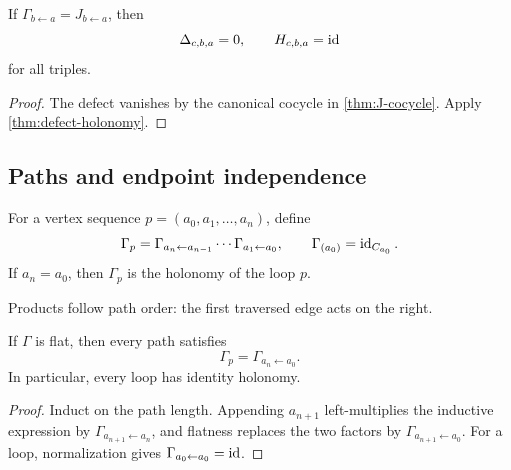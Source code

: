 \begin{corollary}
\label{cor:canonical-zero-defect}
If $\Gamma_{b\leftarrow a}=J_{b\leftarrow a}$, then
\[
\Delta_{c,b,a}=0,
\qquad
H_{c,b,a}=\operatorname{id}
\]
for all triples.
\end{corollary}

\begin{proof}
The defect vanishes by the canonical cocycle in
\cref{thm:J-cocycle}. Apply \cref{thm:defect-holonomy}.
\end{proof}

\subsection{Paths and endpoint independence}

\begin{definition}
\label{def:path-transport}
For a vertex sequence
$p=(a_0,a_1,\ldots,a_n)$, define
\[
\Gamma_p
=
\Gamma_{a_n\leftarrow a_{n-1}}\cdots
\Gamma_{a_1\leftarrow a_0},
\qquad
\Gamma_{(a_0)}=\operatorname{id}_{C_{a_0}}.
\]
If $a_n=a_0$, then $\Gamma_p$ is the holonomy of the loop $p$.
\end{definition}

Products follow path order: the first traversed edge acts on the right.

\begin{proposition}
\label{prop:flat-endpoints}
If $\Gamma$ is flat, then every path satisfies
\[
\Gamma_p=\Gamma_{a_n\leftarrow a_0}.
\]
In particular, every loop has identity holonomy.
\end{proposition}

\begin{proof}
Induct on the path length.  Appending $a_{n+1}$ left-multiplies the
inductive expression by $\Gamma_{a_{n+1}\leftarrow a_n}$, and flatness
replaces the two factors by
$\Gamma_{a_{n+1}\leftarrow a_0}$.  For a loop, normalization gives
$\Gamma_{a_0\leftarrow a_0}=\operatorname{id}$.
\end{proof}

